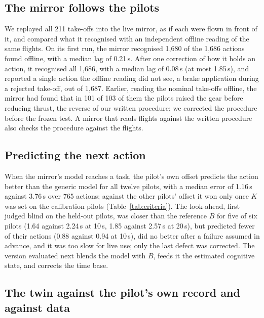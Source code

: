 \documentclass{llncs}
\begin{document}
\subsection{The mirror follows the pilots}
\label{sec:mirror-results}

We replayed all 211 take-offs into the live mirror, as if each were flown in front of it, and compared what it recognised with an
independent offline reading of the same flights. On its first run, the mirror recognised 1,680 of the 1,686 actions found offline, with
a median lag of 0.21\,s. After one correction of how it holds an action, it recognised all 1,686, with a median lag of 0.08\,s (at most
1.85\,s), and reported a single action the offline reading did not see, a brake application during a rejected take-off, out of 1,687.
Earlier, reading the nominal take-offs offline, the mirror had found that in 101 of 103 of them the pilots raised the gear before reducing thrust, the reverse of our written
procedure; we corrected the procedure before the frozen test. A mirror that reads flights against the written procedure also checks the
procedure against the flights.

\subsection{Predicting the next action}

When the mirror's model reaches a task, the pilot's own offset predicts the action better than the generic model for all twelve pilots,
with a median error of 1.16\,s against 3.76\,s over 765 actions; against the other pilots' offset it won only once $K$ was set on the
calibration pilots (Table~\ref{tab:criteria}). The look-ahead, first judged blind on the held-out pilots, was closer than the reference
$B$ for five of six pilots (1.64 against 2.24\,s at 10\,s, 1.85 against 2.57\,s at 20\,s), but predicted fewer of their actions (0.88
against 0.94 at 10\,s), did no better after a failure assumed in advance, and it was too slow for live use; only the last defect was
corrected. The version evaluated next blends the model with $B$, feeds it the estimated cognitive state, and corrects the time base.

\subsection{The twin against the pilot's own record and against data}
\label{sec:own}
\end{document}

